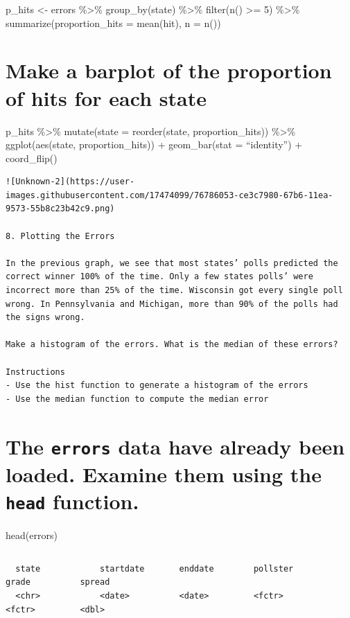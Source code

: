 \documentclass[
]{article}
\begin{document}
p\_hits \textless- errors \%\textgreater\% group\_by(state)
\%\textgreater\% filter(n() \textgreater= 5) \%\textgreater\%
summarize(proportion\_hits = mean(hit), n = n())

\hypertarget{make-a-barplot-of-the-proportion-of-hits-for-each-state}{%
\section{Make a barplot of the proportion of hits for each
state}\label{make-a-barplot-of-the-proportion-of-hits-for-each-state}}

p\_hits \%\textgreater\% mutate(state = reorder(state,
proportion\_hits)) \%\textgreater\% ggplot(aes(state, proportion\_hits))
+ geom\_bar(stat = ``identity'') + coord\_flip()

\begin{verbatim}
![Unknown-2](https://user-images.githubusercontent.com/17474099/76786053-ce3c7980-67b6-11ea-9573-55b8c23b42c9.png)

8. Plotting the Errors

In the previous graph, we see that most states’ polls predicted the correct winner 100% of the time. Only a few states polls’ were incorrect more than 25% of the time. Wisconsin got every single poll wrong. In Pennsylvania and Michigan, more than 90% of the polls had the signs wrong.

Make a histogram of the errors. What is the median of these errors?

Instructions
- Use the hist function to generate a histogram of the errors
- Use the median function to compute the median error
\end{verbatim}

\hypertarget{the-errors-data-have-already-been-loaded.-examine-them-using-the-head-function.}{%
\section{\texorpdfstring{The \texttt{errors} data have already been
loaded. Examine them using the \texttt{head}
function.}{The errors data have already been loaded. Examine them using the head function.}}\label{the-errors-data-have-already-been-loaded.-examine-them-using-the-head-function.}}

head(errors)

\begin{verbatim}
\end{verbatim}

\begin{verbatim}
  state            startdate       enddate        pollster                 grade          spread
  <chr>            <date>          <date>         <fctr>                   <fctr>         <dbl>
\end{verbatim}
\end{document}
